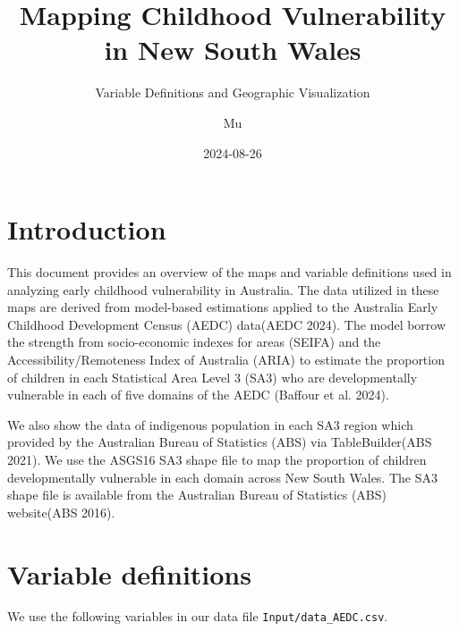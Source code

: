 \documentclass[
  letterpaper,
  DIV=11,
  numbers=noendperiod]{scrartcl}
\title{Mapping Childhood Vulnerability in New South Wales}
\subtitle{Variable Definitions and Geographic Visualization}
\author{Mu}
\date{2024-08-26}
\renewcommand*\contentsname{Table of contents}
\newcommand\contentsname{Table of contents}
\begin{document}
\maketitle

\renewcommand*\contentsname{Table of contents}
{
\hypersetup{linkcolor=}
\setcounter{tocdepth}{3}
\tableofcontents
}
\section{Introduction}\label{introduction}

This document provides an overview of the maps and variable definitions
used in analyzing early childhood vulnerability in Australia. The data
utilized in these maps are derived from model-based estimations applied
to the Australia Early Childhood Development Census (AEDC) data(AEDC
2024). The model borrow the strength from socio-economic indexes for
areas (SEIFA) and the Accessibility/Remoteness Index of Australia (ARIA)
to estimate the proportion of children in each Statistical Area Level 3
(SA3) who are developmentally vulnerable in each of five domains of the
AEDC (Baffour et al. 2024).

We also show the data of indigenous population in each SA3 region which
provided by the Australian Bureau of Statistics (ABS) via
TableBuilder(ABS 2021). We use the ASGS16 SA3 shape file to map the
proportion of children developmentally vulnerable in each domain across
New South Wales. The SA3 shape file is available from the Australian
Bureau of Statistics (ABS) website(ABS 2016).

\section{Variable definitions}\label{variable-definitions}

We use the following variables in our data file
\texttt{Input/data\_AEDC.csv}.
\end{document}
